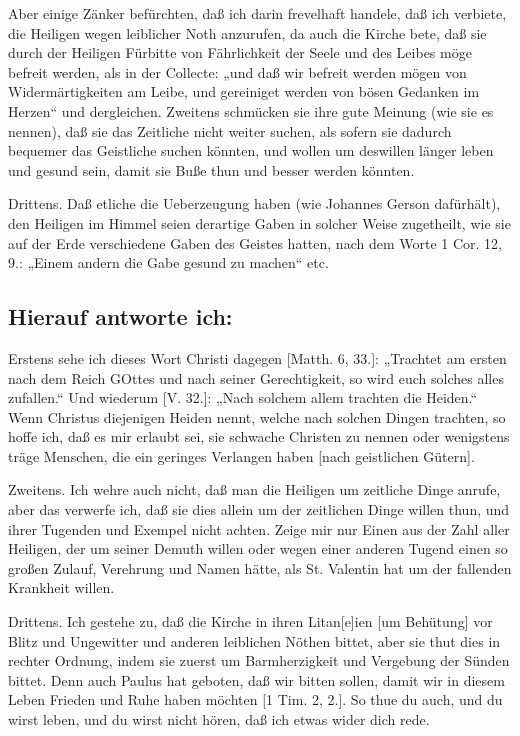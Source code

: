 Aber einige Zänker befürchten, daß ich darin frevelhaft handele, daß ich verbiete, die Heiligen wegen leiblicher Noth anzurufen, da auch die Kirche bete, daß sie durch der Heiligen Fürbitte von Fährlichkeit der Seele und des Leibes möge befreit werden, als in der Collecte: „und daß wir befreit werden mögen von Widermärtigkeiten am Leibe, und gereiniget werden von bösen Gedanken im Herzen“ und dergleichen. Zweitens schmücken sie ihre gute Meinung (wie sie es nennen), daß sie das Zeitliche nicht weiter suchen, als sofern sie dadurch bequemer das Geistliche suchen könnten, und wollen um deswillen länger leben und gesund sein, damit sie Buße thun und besser werden könnten.

Drittens. Daß etliche die Ueberzeugung haben (wie Johannes Gerson dafürhält), den Heiligen im Himmel seien derartige Gaben in solcher Weise zugetheilt, wie sie auf der Erde verschiedene Gaben des Geistes hatten, nach dem Worte 1 Cor. 12, 9.: „Einem andern die Gabe gesund zu machen“ etc.

\subsection{Hierauf antworte ich:}

Erstens sehe ich dieses Wort Christi dagegen [Matth. 6, 33.]: „Trachtet am ersten nach dem Reich GOttes und nach seiner Gerechtigkeit, so wird euch solches alles zufallen.“ Und wiederum [V. 32.]: „Nach solchem allem trachten die Heiden.“ Wenn Christus diejenigen Heiden nennt, welche nach solchen Dingen trachten, so hoffe ich, daß es mir erlaubt sei, sie schwache Christen zu nennen oder wenigstens träge Menschen, die ein geringes Verlangen haben [nach geistlichen Gütern].

Zweitens. Ich wehre auch nicht, daß man die Heiligen um zeitliche Dinge anrufe, aber das verwerfe ich, daß sie dies allein um der zeitlichen Dinge willen thun, und ihrer Tugenden und Exempel nicht achten. Zeige mir nur Einen aus der Zahl aller Heiligen, der um seiner Demuth willen oder wegen einer anderen Tugend einen so großen Zulauf, Verehrung und Namen hätte, als St. Valentin hat um der fallenden Krankheit willen.

Drittens. Ich gestehe zu, daß die Kirche in ihren Litan[e]ien [um Behütung] vor Blitz und Ungewitter und anderen leiblichen Nöthen bittet, aber sie thut dies in rechter Ordnung, indem sie zuerst um Barmherzigkeit und Vergebung der Sünden bittet. Denn auch Paulus hat geboten, daß wir bitten sollen, damit wir in diesem Leben Frieden und Ruhe haben möchten [1 Tim. 2, 2.]. So thue du auch, und du wirst leben, und du wirst nicht hören, daß ich etwas wider dich rede.

